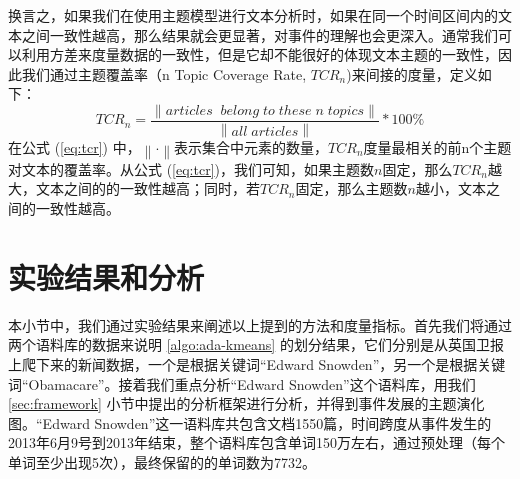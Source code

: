换言之，如果我们在使用主题模型进行文本分析时，如果在同一个时间区间内的文本之间一致性越高，那么结果就会更显著，对事件的理解也会更深入。通常我们可以利用方差来度量数据的一致性，但是它却不能很好的体现文本主题的一致性，因此我们通过主题覆盖率（n Topic Coverage Rate, $TCR_n$)来间接的度量，定义如下：
\begin{equation}
\label{eq:tcr}
TCR_n = \frac{\left \| articles\;\;belong\;to\;these\;n\;topics \right \|}{\left \| all\;articles \right \|} * 100\%
\end{equation}
在公式 (\ref{eq:tcr}) 中，$\left \| \cdot \right \|$表示集合中元素的数量，$TCR_n$度量最相关的前n个主题对文本的覆盖率。从公式 (\ref{eq:tcr})，我们可知，如果主题数$n$固定，那么$TCR_n$越大，文本之间的的一致性越高；同时，若$TCR_n$固定，那么主题数$n$越小，文本之间的一致性越高。


\section{实验结果和分析}
本小节中，我们通过实验结果来阐述以上提到的方法和度量指标。首先我们将通过两个语料库的数据来说明 \ref{algo:ada-kmeans} 的划分结果，它们分别是从英国卫报上爬下来的新闻数据，一个是根据关键词“Edward Snowden”，另一个是根据关键词“Obamacare”。接着我们重点分析“Edward Snowden”这个语料库，用我们 \ref{sec:framework} 小节中提出的分析框架进行分析，并得到事件发展的主题演化图。“Edward Snowden”这一语料库共包含文档1550篇，时间跨度从事件发生的2013年6月9号到2013年结束，整个语料库包含单词150万左右，通过预处理（每个单词至少出现5次），最终保留的的单词数为7732。
